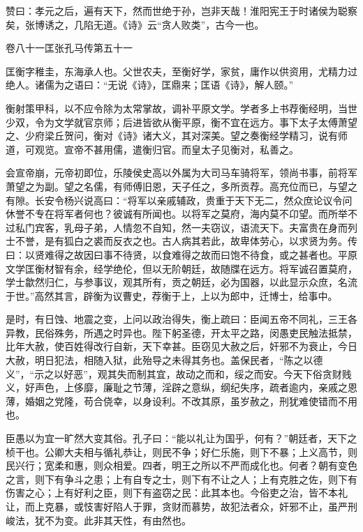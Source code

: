 \documentclass[12pt,UTF8]{ctexbook}
\begin{document}
赞曰：孝元之后，遍有天下，然而世绝于孙，岂非天哉！淮阳宪王于时诸侯为聪察矣，张博诱之，几陷无道。《诗》云“贪人败类”，古今一也。





卷八十一匡张孔马传第五十一



匡衡字稚圭，东海承人也。父世农夫，至衡好学，家贫，庸作以供资用，尤精力过绝人。诸儒为之语曰：“无说《诗》，匡鼎来；匡语《诗》，解人颐。”



衡射策甲科，以不应令除为太常掌故，调补平原文学。学者多上书荐衡经明，当世少双，令为文学就官京师；后进皆欲从衡平原，衡不宜在远方。事下太子太傅萧望之、少府梁丘贺问，衡对《诗》诸大义，其对深美。望之奏衡经学精习，说有师道，可观览。宣帝不甚用儒，遣衡归官。而皇太子见衡对，私善之。



会宣帝崩，元帝初即位，乐陵侯史高以外属为大司马车骑将军，领尚书事，前将军萧望之为副。望之名儒，有师傅旧恩，天子任之，多所贡荐。高充位而已，与望之有隙。长安令杨兴说高曰：“将军以亲戚辅政，贵重于天下无二，然众庶论议令问休誉不专在将军者何也？彼诚有所闻也。以将军之莫府，海内莫不卬望。而所举不过私门宾客，乳母子弟，人情忽不自知，然一夫窃议，语流天下。夫富贵在身而列士不誉，是有狐白之裘而反衣之也。古人病其若此，故卑体劳心，以求贤为务。传曰：以贤难得之故因曰事不待贤，以食难得之故而曰饱不待食，或之甚者也。平原文学匡衡材智有余，经学绝伦，但以无阶朝廷，故随牒在远方。将军诚召置莫府，学士歙然归仁，与参事议，观其所有，贡之朝廷，必为国器，以此显示众庶，名流于世。”高然其言，辟衡为议曹史，荐衡于上，上以为郎中，迁博士，给事中。



是时，有日蚀、地震之变，上问以政治得失，衡上疏曰：臣闻五帝不同礼，三王各异教，民俗殊务，所遇之时异也。陛下躬圣德，开太平之路，闵愚吏民触法抵禁，比年大赦，使百姓得改行自新，天下幸甚。臣窃见大赦之后，奸邪不为衰止，今日大赦，明日犯法，相随入狱，此殆导之未得其务也。盖保民者，“陈之以德义”，“示之以好恶”，观其失而制其宜，故动之而和，绥之而安。今天下俗贪财贱义，好声色，上侈靡，廉耻之节薄，淫辟之意纵，纲纪失序，疏者逾内，亲戚之恩薄，婚姻之党隆，苟合侥幸，以身设利。不改其原，虽岁赦之，刑犹难使错而不用也。



臣愚以为宜一旷然大变其俗。孔子曰：“能以礼让为国乎，何有？”朝廷者，天下之桢干也。公卿大夫相与循礼恭让，则民不争；好仁乐施，则下不暴；上义高节，则民兴行；宽柔和惠，则众相爱。四者，明王之所以不严而成化也。何者？朝有变色之言，则下有争斗之患；上有自专之士，则下有不让之人；上有克胜之佐，则下有伤害之心；上有好利之臣，则下有盗窃之民：此其本也。今俗吏之治，皆不本礼让，而上克暴，或忮害好陷人于罪，贪财而慕势，故犯法者众，奸邪不止，虽严刑峻法，犹不为变。此非其天性，有由然也。
\end{document}
